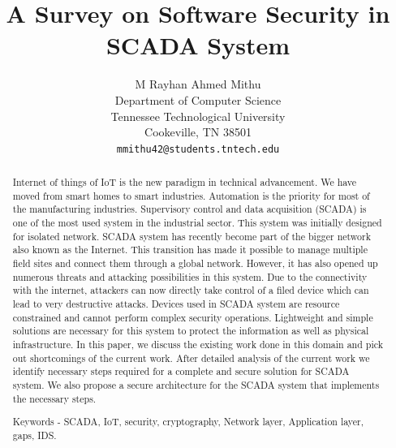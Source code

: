 \documentclass[letterpaper, 10 pt, conference]{ieeeconf}  %
\title{\LARGE \bf
A Survey on Software Security in SCADA System
}
\author{ \parbox{3 in}{\centering M Rayhan Ahmed Mithu\\
        Department of Computer Science\\
        Tennessee Technological University\\
        Cookeville, TN 38501\\
        {\tt\small mmithu42@students.tntech.edu}}
}
\begin{document}
\maketitle
\thispagestyle{empty}
\pagestyle{empty}


\begin{abstract}
Internet of things of IoT is the new paradigm in technical advancement. We have moved from smart homes to smart industries. Automation is the priority for most of the manufacturing industries. Supervisory control and data acquisition (SCADA) is one of the most used system in the industrial sector. This system was initially designed for isolated network. SCADA system has recently become part of the bigger network also known as the Internet. This transition has made it possible to manage multiple field sites and connect them through a global network. However, it has also opened up numerous threats and attacking possibilities in this system. Due to the connectivity with the internet, attackers can now directly take control of a filed device which can lead to very destructive attacks. Devices used in SCADA system are resource constrained and cannot perform complex security operations. Lightweight and simple solutions are necessary for this system to protect the information as well as physical infrastructure. In this paper, we discuss the existing work done in this domain and pick out shortcomings of the current work. After detailed analysis of the current work we identify necessary steps required for a complete and secure solution for SCADA system. We also propose a secure architecture for the SCADA system that implements the necessary steps.
\\
\par\noindent Keywords - SCADA, IoT, security, cryptography, Network layer, Application layer, gaps, IDS.

\end{abstract}


\end{document}
